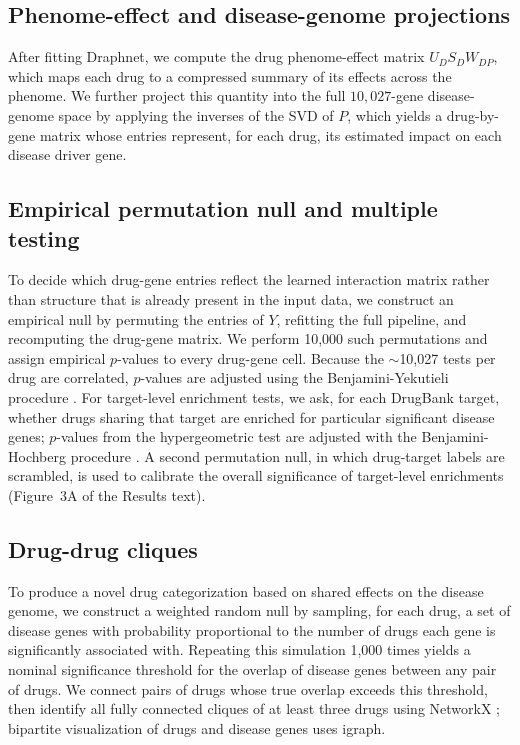 \documentclass[11pt]{article}
\begin{document}
\subsection{Phenome-effect and disease-genome projections}

After fitting Draphnet, we compute the drug phenome-effect matrix
$U_D S_D W_{DP}$, which maps each drug to a compressed summary of its
effects across the phenome. We further project this quantity into the
full $10{,}027$-gene disease-genome space by applying the inverses of
the SVD of $P$, which yields a drug-by-gene matrix whose entries
represent, for each drug, its estimated impact on each disease driver
gene.

\subsection{Empirical permutation null and multiple testing}

To decide which drug-gene entries reflect the learned interaction
matrix rather than structure that is already present in the input data,
we construct an empirical null by permuting the entries of $Y$,
refitting the full pipeline, and recomputing the drug-gene matrix. We
perform 10,000 such permutations and assign empirical $p$-values to
every drug-gene cell. Because the $\sim$10,027 tests per drug are
correlated, $p$-values are adjusted using the Benjamini-Yekutieli
procedure \citep{benjamini2001fdrdependency}. For target-level
enrichment tests, we ask, for each DrugBank target, whether drugs
sharing that target are enriched for particular significant disease
genes; $p$-values from the hypergeometric test are adjusted with the
Benjamini-Hochberg procedure \citep{benjamini1995fdr}. A second
permutation null, in which drug-target labels are scrambled, is used to
calibrate the overall significance of target-level enrichments
(Figure~3A of the Results text).

\subsection{Drug-drug cliques}

To produce a novel drug categorization based on shared effects on the
disease genome, we construct a weighted random null by sampling, for
each drug, a set of disease genes with probability proportional to the
number of drugs each gene is significantly associated with. Repeating
this simulation 1,000 times yields a nominal significance threshold for
the overlap of disease genes between any pair of drugs. We connect
pairs of drugs whose true overlap exceeds this threshold, then identify
all fully connected cliques of at least three drugs using NetworkX
\citep{hagberg2008networkx}; bipartite visualization of drugs and
disease genes uses igraph.
\end{document}
